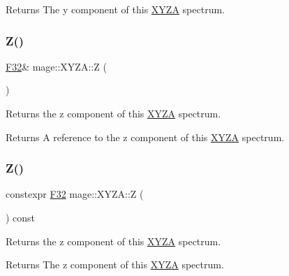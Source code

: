 \begin{DoxyReturn}{Returns}
The y component of this \mbox{\hyperlink{structmage_1_1_x_y_z_a}{X\+Y\+ZA}} spectrum. 
\end{DoxyReturn}
\mbox{\label{structmage_1_1_x_y_z_a_ad2c3f7091955f36256c28ef5c31301e5}} 
\subsubsection{\texorpdfstring{Z()}{Z()}\hspace{0.1cm}{\footnotesize\ttfamily [1/2]}}
{\footnotesize\ttfamily \mbox{\hyperlink{namespacemage_aa97e833b45f06d60a0a9c4fc22ae02c0}{F32}}\& mage\+::\+X\+Y\+Z\+A\+::Z (\begin{DoxyParamCaption}{ }\end{DoxyParamCaption})\hspace{0.3cm}{\ttfamily [noexcept]}}

Returns the z component of this \mbox{\hyperlink{structmage_1_1_x_y_z_a}{X\+Y\+ZA}} spectrum.

\begin{DoxyReturn}{Returns}
A reference to the z component of this \mbox{\hyperlink{structmage_1_1_x_y_z_a}{X\+Y\+ZA}} spectrum. 
\end{DoxyReturn}
\mbox{\label{structmage_1_1_x_y_z_a_ac17cb31ebc0d375da6df6601d0096b72}} 
\subsubsection{\texorpdfstring{Z()}{Z()}\hspace{0.1cm}{\footnotesize\ttfamily [2/2]}}
{\footnotesize\ttfamily constexpr \mbox{\hyperlink{namespacemage_aa97e833b45f06d60a0a9c4fc22ae02c0}{F32}} mage\+::\+X\+Y\+Z\+A\+::Z (\begin{DoxyParamCaption}{ }\end{DoxyParamCaption}) const\hspace{0.3cm}{\ttfamily [noexcept]}}

Returns the z component of this \mbox{\hyperlink{structmage_1_1_x_y_z_a}{X\+Y\+ZA}} spectrum.

\begin{DoxyReturn}{Returns}
The z component of this \mbox{\hyperlink{structmage_1_1_x_y_z_a}{X\+Y\+ZA}} spectrum. 
\end{DoxyReturn}
